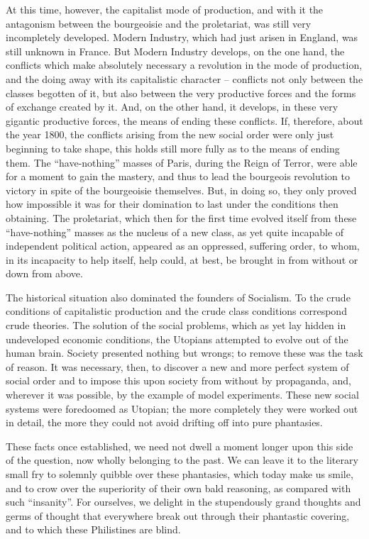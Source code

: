 At this time, however, the capitalist mode of production, and with it the
antagonism between the bourgeoisie and the proletariat, was still very
incompletely developed. Modern Industry, which had just arisen in England, was
still unknown in France. But Modern Industry develops, on the one hand, the
conflicts which make absolutely necessary a revolution in the mode of
production, and the doing away with its capitalistic character – conflicts not
only between the classes begotten of it, but also between the very productive
forces and the forms of exchange created by it. And, on the other hand, it
develops, in these very gigantic productive forces, the means of ending these
conflicts. If, therefore, about the year 1800, the conflicts arising from the
new social order were only just beginning to take shape, this holds still more
fully as to the means of ending them. The ``have-nothing'' masses of Paris,
during the Reign of Terror, were able for a moment to gain the mastery, and thus
to lead the bourgeois revolution to victory in spite of the bourgeoisie
themselves. But, in doing so, they only proved how impossible it was for their
domination to last under the conditions then obtaining. The proletariat, which
then for the first time evolved itself from these ``have-nothing'' masses as the
nucleus of a new class, as yet quite incapable of independent political action,
appeared as an oppressed, suffering order, to whom, in its incapacity to help
itself, help could, at best, be brought in from without or down from above.

The historical situation also dominated the founders of Socialism. To the crude
conditions of capitalistic production and the crude class conditions correspond
crude theories. The solution of the social problems, which as yet lay hidden in
undeveloped economic conditions, the Utopians attempted to evolve out of the
human brain. Society presented nothing but wrongs; to remove these was the task
of reason. It was necessary, then, to discover a new and more perfect system of
social order and to impose this upon society from without by propaganda, and,
wherever it was possible, by the example of model experiments. These new social
systems were foredoomed as Utopian; the more completely they were worked out in
detail, the more they could not avoid drifting off into pure phantasies.

These facts once established, we need not dwell a moment longer upon this side
of the question, now wholly belonging to the past. We can leave it to the
literary small fry to solemnly quibble over these phantasies, which today make
us smile, and to crow over the superiority of their own bald reasoning, as
compared with such ``insanity''. For ourselves, we delight in the stupendously
grand thoughts and germs of thought that everywhere break out through their
phantastic covering, and to which these Philistines are blind.

